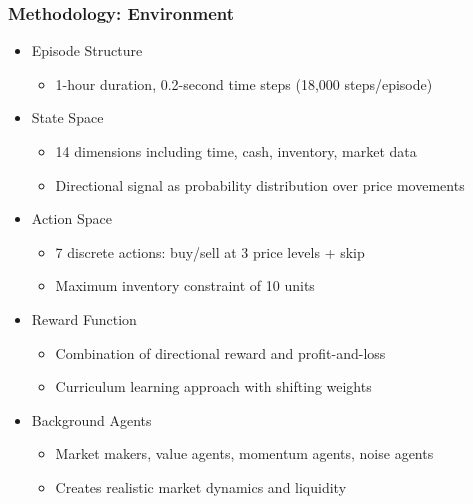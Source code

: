\documentclass{beamer}
\begin{document}
\begin{frame}
  \frametitle{Methodology: Environment}

  \begin{itemize}
    \item Episode Structure
    \begin{itemize}
      \item 1-hour duration, 0.2-second time steps (18,000 steps/episode)
    \end{itemize}
    \item State Space
    \begin{itemize}
      \item 14 dimensions including time, cash, inventory, market data
      \item Directional signal as probability distribution over price movements
    \end{itemize}
    \item Action Space
    \begin{itemize}
      \item 7 discrete actions: buy/sell at 3 price levels + skip
      \item Maximum inventory constraint of 10 units
    \end{itemize}
    \item Reward Function
    \begin{itemize}
      \item Combination of directional reward and profit-and-loss
      \item Curriculum learning approach with shifting weights
    \end{itemize}
    \item Background Agents
    \begin{itemize}
      \item Market makers, value agents, momentum agents, noise agents
      \item Creates realistic market dynamics and liquidity
    \end{itemize}
  \end{itemize}
\end{frame}
\end{document}
